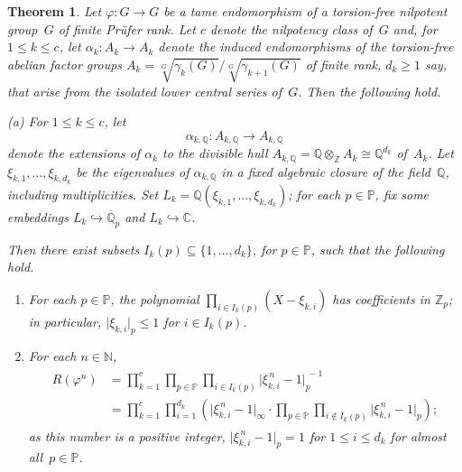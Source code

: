 \documentclass[12pt, a4paper]{amsart}
\def\a{\alpha}
\newtheorem{theorem}{Theorem}
\begin{document}
\begin{theorem} \label{thm:main-result-nilpotent}
  Let $\varphi \colon G \to G$ be a tame endomorphism of a
  torsion-free nilpotent group~$G$ of finite Pr\"ufer rank.  Let $c$
  denote the nilpotency class of~$G$ and, for $1 \le k \le c$, let
  $\a_k: A_k \to A_k$ denote the induced
  endomorphisms of the torsion-free abelian factor groups
  $A_k=\sqrt[G]{\gamma_k(G)} / \sqrt[G]{\gamma_{k+1}(G)}$ of finite
  rank, $d_k\geq 1$ say, that arise from the isolated lower central
  series  of~$G$.  Then the following hold.

  \smallskip
  \rm{(a)} For $1 \le k \le c$, let
  $$
    \a_{k,\mathbb{Q}} \colon
    A_{k,\mathbb{Q}} \to
    A_{k,\mathbb{Q}}
  $$
  denote the extensions of $\a_k $ to the divisible hull
  $A_{k,\mathbb{Q}} = \mathbb{Q} \otimes_\mathbb{Z} A_k \cong
  \mathbb{Q}^{d_k}$ of~$A_k$.  Let $\xi_{k,1},\ldots, \xi_{k,d_k}$  be the eigenvalues of
  $\a_{k,\mathbb{Q}}$  in a fixed
  algebraic closure of the field~$\mathbb{Q}$, including
  multiplicities.  Set
  $L_k = \mathbb{Q}(\xi_{k,1}, \ldots, \xi_{k,d_k})$; for each $p \in \mathbb{P}$, fix
  some embeddings $L_k \hookrightarrow \overline{\mathbb{Q}}_p$ and  $L_k \hookrightarrow \mathbb{C}$.

  Then there exist subsets $I_k(p) \subseteq \{1,\ldots,d_k\}$, for
  $p \in \mathbb{P}$, such that the following hold.
  \begin{enumerate}%
  \item[(i)] For each $p \in \mathbb{P}$, the polynomial
    $\prod_{i \in I_k(p)} (X - \xi_{k,i})$ has coefficients in
    $\mathbb{Z}_p$; in particular,
    $\lvert \xi_{k,i} \rvert_p  \le 1$ for
    $i \in I_k(p)$.
  \item[(ii)] For each $n \in \mathbb{N}$,
  \begin{align} \label{equ:key-formula}
  \begin{split}
    R(\varphi^n) &= \prod_{k=1}^c\prod_{p \in \mathbb{P}}
    \prod_{i \in I_k(p)} \lvert \xi_{k,i}^{\, n} - 1
    \rvert_p^{\, -1} \\
    &= \prod_{k=1}^c\prod_{i=1}^{d_k } \left(\lvert \xi_{k,i}^{\, n} - 1 \rvert_\infty \cdot \prod_{p \in \mathbb{P}}
    \prod_{i \not \in I_k(p)} \lvert \xi_{k,i}^{\, n} - 1 \rvert_p\right);
  \end{split}
  \end{align}
    as this number is a positive integer,
    $\lvert \xi_{k,i}^{\, n} - 1 \rvert_p = 1$ for
    $1 \le i \le d_k$ for almost all~$p \in \mathbb{P}$.
  \end{enumerate}


\end{theorem}
\end{document}
